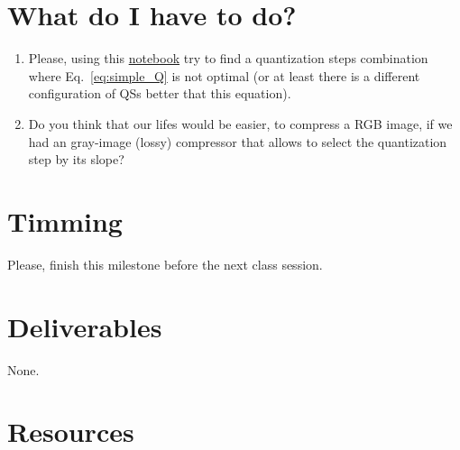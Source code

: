 \section{What do I have to do?}
\begin{enumerate}
\item Please, using this
  \href{https://github.com/Sistemas-Multimedia/Sistemas-Multimedia.github.io/blob/master/milestones/05-RGB_compression/RGB_compression.ipynb}{notebook}
  try to find a quantization steps combination where
  Eq.~\ref{eq:simple_Q} is not optimal (or at least there is a
  different configuration of QSs better that this equation).
\item Do you think that our lifes would be easier, to compress a RGB
  image, if we had an gray-image (lossy) compressor that allows to
  select the quantization step by its slope?
\end{enumerate}

\section{Timming}

Please, finish this milestone before the next class session.

\section{Deliverables}

None.

\section{Resources}

\renewcommand{\addcontentsline}[3]{}%

